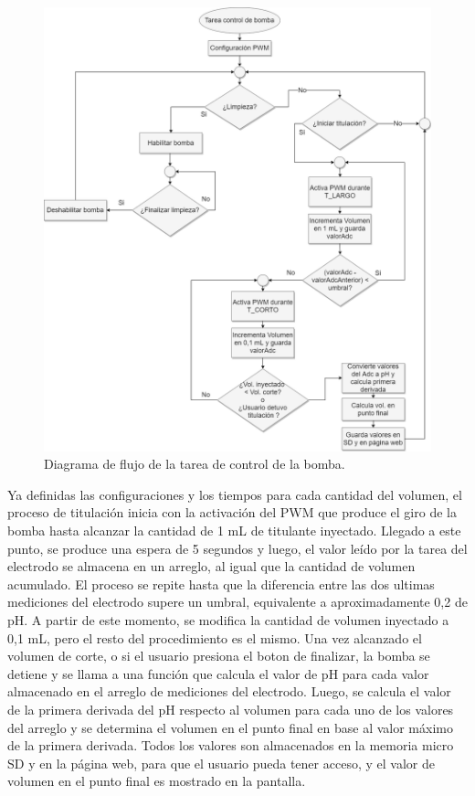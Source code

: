 \begin{figure}[htbp]
	\centering
	\includegraphics[width=1.0\textwidth]{./Figures/motorBomba.png}
	\caption{Diagrama de flujo de la tarea de control de la bomba.}
	\label{fig:flujoBomba}
\end{figure}

Ya definidas las configuraciones y los tiempos para cada cantidad del volumen, el proceso de titulación inicia con la activación del PWM que produce el giro de la bomba hasta alcanzar la cantidad de 1 mL de titulante inyectado. Llegado a este punto, se produce una espera de 5 segundos y luego, el valor leído por la tarea del electrodo se almacena en un arreglo, al igual que la cantidad de volumen acumulado. El proceso se repite hasta que la diferencia entre las dos ultimas mediciones del electrodo supere un umbral, equivalente a aproximadamente 0,2 de pH. A partir de este momento, se modifica la cantidad de volumen inyectado a 0,1 mL, pero el resto del procedimiento es el mismo. Una vez alcanzado el volumen de corte, o si el usuario presiona el boton de finalizar, la bomba se detiene y se llama a una función que calcula el valor de pH para cada valor almacenado en el arreglo de mediciones del electrodo. Luego, se calcula el valor de la primera derivada del pH respecto al volumen para cada uno de los valores del arreglo y se determina el volumen en el punto final en base al valor máximo de la primera derivada. Todos los valores son almacenados en la memoria micro SD y en la página web, para que el usuario pueda tener acceso, y el valor de volumen en el punto final es mostrado en la pantalla.


